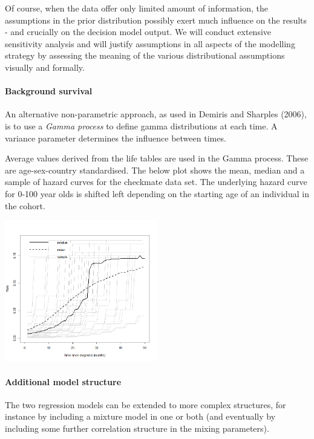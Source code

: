 \documentclass[
]{article}
\begin{document}
Of course, when the data offer only limited amount of information, the
assumptions in the prior distribution possibly exert much influence on
the results - and crucially on the decision model output. We will
conduct extensive sensitivity analysis and will justify assumptions in
all aspects of the modelling strategy by assessing the meaning of the
various distributional assumptions visually and formally.

\hypertarget{background-survival-1}{%
\paragraph{Background survival}\label{background-survival-1}}

An alternative non-parametric approach, as used in Demiris and Sharples
(2006), is to use a \emph{Gamma process} to define gamma distributions
at each time. A variance parameter determines the influence between
times.

Average values derived from the life tables are used in the Gamma
process. These are age-sex-country standardised. The below plot shows
the mean, median and a sample of hazard curves for the checkmate data
set. The underlying hazard curve for 0-100 year olds is shifted left
depending on the starting age of an individual in the cohort.

\includegraphics[width=0.5\textwidth,height=\textheight]{../docs/background_average_rate_plot.png}

\hypertarget{additional-model-structure}{%
\paragraph{Additional model
structure}\label{additional-model-structure}}

The two regression models can be extended to more complex structures,
for instance by including a mixture model in one or both (and eventually
by including some further correlation structure in the mixing
parameters).
\end{document}
